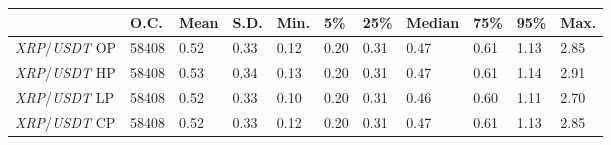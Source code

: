 \begin{tabular}{lllllllllll}
\toprule
 & \textbf{O.C.} & \textbf{Mean} & \textbf{S.D.} & \textbf{Min.} & \textbf{5\%} & \textbf{25\%} & \textbf{Median} & \textbf{75\%} & \textbf{95\%} & \textbf{Max.} \\
\midrule
\emph{XRP}/\emph{USDT} OP & 58408 & 0.52 & 0.33 & 0.12 & 0.20 & 0.31 & 0.47 & 0.61 & 1.13 & 2.85 \\
\emph{XRP}/\emph{USDT} HP & 58408 & 0.53 & 0.34 & 0.13 & 0.20 & 0.31 & 0.47 & 0.61 & 1.14 & 2.91 \\
\emph{XRP}/\emph{USDT} LP & 58408 & 0.52 & 0.33 & 0.10 & 0.20 & 0.31 & 0.46 & 0.60 & 1.11 & 2.70 \\
\emph{XRP}/\emph{USDT} CP & 58408 & 0.52 & 0.33 & 0.12 & 0.20 & 0.31 & 0.47 & 0.61 & 1.13 & 2.85 \\
\bottomrule
\end{tabular}
